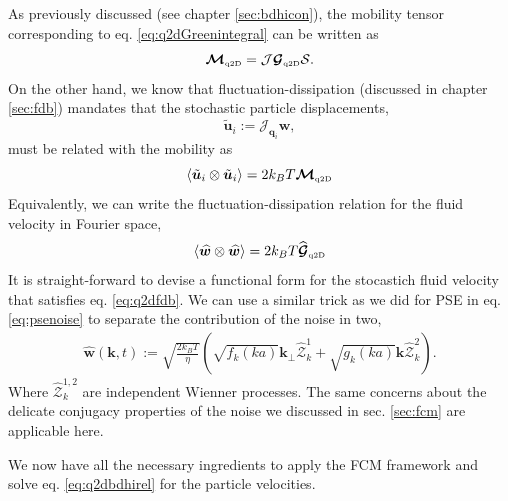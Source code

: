 \documentclass[ twoside,openright,titlepage,numbers=noenddot,%
headinclude,footinclude,cleardoublepage=empty,abstract=on,
BCOR=5mm,paper=a4,fontsize=11pt, dvipsnames
]{scrreprt}
\renewcommand{\vec}[1]{\bm{#1}}
\newcommand{\tens}[1]{\bm{\mathcal{#1}}}
\newcommand{\oper}[1]{\mathcal{#1}}
\newcommand{\kT}{k_B T}
\newcommand{\half}{\frac{1}{2}}
\newcommand{\fou}[1]{\widehat{#1}}
\newcommand{\ppos}{q}
\newcommand{\pvel}{u}
\newcommand{\qtd}{\text{\tiny q2D}}
\begin{document}
As previously discussed (see chapter \ref{sec:bdhicon}), the mobility tensor corresponding to eq. \eqref{eq:q2dGreenintegral} can be written as
\begin{equation}
  \tens{M}_{\qtd} = \oper{J}\tens{G}_{\qtd}\oper{S}.
\end{equation}
On the other hand, we know that fluctuation-dissipation (discussed in chapter \ref{sec:fdb}) mandates that the stochastic particle displacements,
\begin{equation}
\tilde{\vec{\pvel}}_i := \oper{J}_{\vec{\ppos}_i}\vec{w},
\end{equation}
must be related with the mobility as
\begin{equation}
  \langle\tilde{\vec{\pvel}}_i\otimes\tilde{\vec{\pvel}}_i\rangle = 2\kT \tens{M}_{\qtd}
\end{equation}
Equivalently, we can write the fluctuation-dissipation relation for the fluid velocity in Fourier space,
\begin{equation}
  \label{eq:q2dfdb}
  \left\langle\fou{\vec{w}}\otimes \fou{\vec{w}}\right\rangle = 2\kT \fou{\tens{G}}_{\qtd}
\end{equation}
It is straight-forward to devise a functional form for the stocastich fluid velocity that satisfies eq. \eqref{eq:q2dfdb}.
We can use a similar trick as we did for \gls{PSE} in eq. \eqref{eq:psenoise} to separate the contribution of the noise in two,
\begin{equation}
  \begin{aligned}
    \fou{\vec{w}}(\vec{k}, t) := \sqrt{\frac{2\kT}{\eta}}\left(\sqrt{f_k(ka)}\vec{k}_\perp\fou{\tens{Z}}^1_k + \sqrt{g_k(ka)}\vec{k}\fou{\tens{Z}}^2_k\right).
  \end{aligned}
\end{equation}
Where $\fou{\tens{Z}}^{1,2}_k$ are independent Wienner processes. The same concerns about the delicate conjugacy properties of the noise we discussed in sec. \ref{sec:fcm} are applicable here.

We now have all the necessary ingredients to apply the \gls{FCM} framework and solve eq. \eqref{eq:q2dbdhirel} for the particle velocities.
\end{document}

